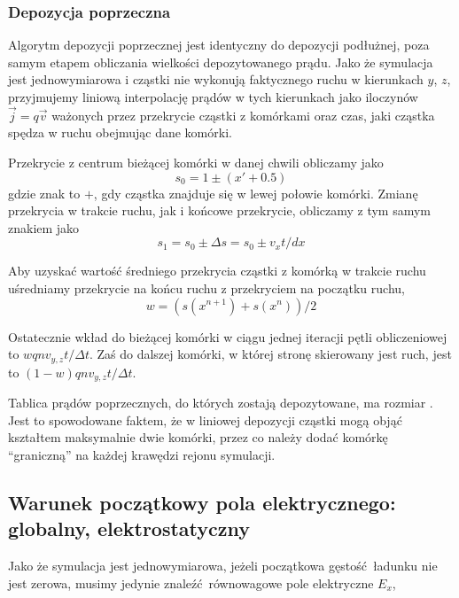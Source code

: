 \subsubsection{Depozycja poprzeczna}
Algorytm depozycji poprzecznej jest identyczny do depozycji podłużnej, poza samym etapem obliczania
wielkości depozytowanego prądu. Jako że symulacja jest jednowymiarowa i cząstki nie wykonują
faktycznego ruchu w kierunkach $y$, $z$, przyjmujemy liniową interpolację
prądów w tych kierunkach jako iloczynów $\vec{j}=q\vec{v}$ ważonych przez przekrycie
cząstki z komórkami oraz czas, jaki cząstka spędza w ruchu obejmując dane
komórki.

Przekrycie z centrum bieżącej komórki w danej chwili obliczamy jako
\begin{equation}
    s_0 = 1 \pm (x' + 0.5) 
\end{equation}
gdzie znak to $+$, gdy cząstka znajduje się w lewej połowie komórki. Zmianę
przekrycia w trakcie ruchu, jak i końcowe przekrycie, obliczamy z tym samym znakiem jako 
\begin{equation}
    s_1 = s_0 \pm \Delta s = s_0 \pm v_x t / dx
\end{equation}


Aby uzyskać wartość średniego przekrycia cząstki z komórką w trakcie ruchu
uśredniamy przekrycie na końcu ruchu z przekryciem na początku ruchu,
\begin{equation}
    w = \left(s(x^{n+1}) + s(x^n)\right)/{2}
\end{equation}

Ostatecznie wkład do bieżącej komórki w ciągu jednej iteracji pętli obliczeniowej
to $w q n v_{y, z} t / \Delta t$.
Zaś do dalszej komórki, w której stronę skierowany jest ruch, jest to  $(1-w) q n v_{y, z} t / \Delta t$.

Tablica prądów poprzecznych, do których zostają depozytowane, ma rozmiar
. Jest to spowodowane faktem, że w liniowej depozycji
cząstki mogą objąć kształtem maksymalnie dwie komórki, przez co należy dodać
komórkę ``graniczną'' na każdej krawędzi rejonu symulacji.

\subsection{Warunek początkowy pola elektrycznego:  globalny, elektrostatyczny}
Jako że symulacja jest jednowymiarowa, jeżeli początkowa gęstość ładunku nie jest zerowa, musimy jedynie znaleźć równowagowe pole
elektryczne $E_x$,

